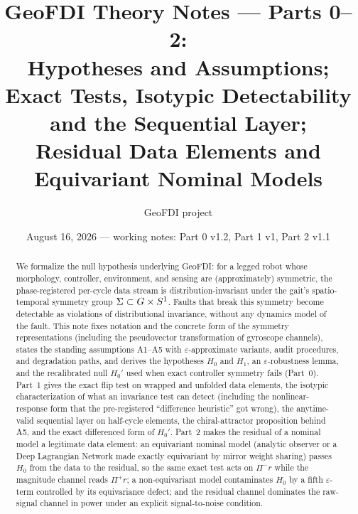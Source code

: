 \documentclass[11pt]{article}
\title{GeoFDI Theory Notes --- Parts 0--2:\\ Hypotheses and Assumptions; Exact Tests, Isotypic Detectability and the Sequential Layer;\\ Residual Data Elements and Equivariant Nominal Models}
\author{GeoFDI project}
\date{August 16, 2026 --- working notes: Part 0 v1.2, Part 1 v1, Part 2 v1.1}
\begin{document}
\maketitle

\begin{abstract}
We formalize the null hypothesis underlying GeoFDI: for a legged robot whose
morphology, controller, environment, and sensing are (approximately) symmetric,
the phase-registered per-cycle data stream is distribution-invariant under the
gait's spatio-temporal symmetry group $\Sigma \subset G \times S^1$. Faults
that break this symmetry become detectable as violations of distributional
invariance, without any dynamics model of the fault. This note fixes notation
and the concrete form of the symmetry representations (including the
pseudovector transformation of gyroscope channels), states the standing
assumptions A1--A5 with $\varepsilon$-approximate variants, audit procedures,
and degradation paths, and derives the hypotheses $H_0$ and $H_1$, an
$\varepsilon$-robustness lemma, and the recalibrated null $H_0'$ used when
exact controller symmetry fails (Part~0). Part~1 gives the exact flip test
on wrapped and unfolded data elements, the isotypic characterization of
what an invariance test can detect (including the nonlinear-response form
that the pre-registered ``difference heuristic'' got wrong), the anytime-valid
sequential layer on half-cycle elements, the chiral-attractor proposition
behind A5, and the exact differenced form of $H_0'$. Part~2 makes the residual of a nominal model a
legitimate data element: an equivariant nominal model (analytic observer or
a Deep Lagrangian Network made exactly equivariant by mirror weight sharing)
passes $H_0$ from the data to the residual, so the same exact test acts on
$\Pi^{-}r$ while the magnitude channel reads $\Pi^{+}r$; a non-equivariant
model contaminates $H_0$ by a fifth $\varepsilon$-term controlled by its
equivariance defect; and the residual channel dominates the raw-signal
channel in power under an explicit signal-to-noise condition.
\end{abstract}

\tableofcontents
\listoftodos










\end{document}
